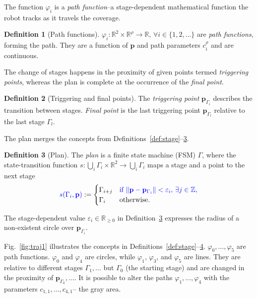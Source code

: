 \documentclass[letterpaper,10pt,journal,twoside]{IEEEtran}
\DeclarePairedDelimiter\norm{\lVert}{\rVert}%
\theoremstyle{definition}
\newtheorem{defn}{Definition}[section]
\begin{document}
The function $\varphi_i$ is a \emph{path function}{\color{blue}--a }%
stage-dependent mathematical function %
the %
robot tracks as it travels %
the coverage. 

\begin{defn}[Path functions]
  \label{def:paths}
  $\varphi_i:\mathbb{R}^2\times\mathbb{R}^\rho\rightarrow\mathbb{R},\,\forall i\in\{1,2,\dots\}
  $ are \emph{path functions}, forming the path. They are a function of {\color{blue}$\mathbf{p}%
  $} and path parameters $c_i^\rho%
  $ and are continuous.%
\end{defn}

The change of stages happens in the proximity of given points termed \emph{triggering points}, whereas the plan is complete at the occurrence of the \emph{final point}.

\begin{defn}[Triggering and final points]
  \label{def:trigs}
  The \emph{triggering point} $\mathbf{p}_{\Gamma_{i}}$ describes the transition between stages. \emph{Final point} is the last triggering point $\mathbf{p}_{\Gamma_{l}}$ relative to the last stage $\Gamma_l$.
\end{defn}

The plan merges the concepts from Definitions~\ref{def:stage}--\hyperref[def:trigs]{3}. %

\begin{defn}[Plan]\label{def:plan}
  The \emph{plan} is a finite state machine (FSM) $\Gamma$, where the state-transition function $s:\bigcup_i{\Gamma_i}\times\mathbb{R}^2\rightarrow\bigcup_i{\Gamma_i}$ maps a stage and a point to the next stage
  \begin{equation*}{\color{blue}s(\Gamma_i,\mathbf{p}%
    )}:=\begin{cases}
    \Gamma_{i+j} & {\color{blue}\text{if }\norm{\mathbf{p}%
    -\mathbf{p}_{\Gamma_i}}<\varepsilon_i,\,\exists j\in\mathbb{Z},}\\
    \Gamma_i & \text{otherwise}.
  \end{cases}\end{equation*}
\end{defn}

The stage-dependent value $\varepsilon_i\in\mathbb{R}_{\geq 0}$ in Definition~\ref{def:plan} expresses the radius of a non-existent circle over $\mathbf{p}_{\Gamma_i}$.

Fig.~\ref{fig:traj1} illustrates the concepts in Definitions~\ref{def:stage}--\hyperref[def:plan]{4}. $\varphi_0,\dots,\varphi_5$ are path functions. $\varphi_0$ and $\varphi_4$ are circles, while $\varphi_1$, $\varphi_3$, and $\varphi_5$ are lines. They are relative to different stages $\Gamma_1,\dots$ but $\Gamma_0$ (the starting stage) and are changed in the proximity of $\mathbf{p}_{\Gamma_0},\dots$. %
It is possible to alter the paths $\varphi_1,\dots,\varphi_4$ with the parameters $c_{1,1},\dots,c_{4,1}$--%
the gray area.%
\end{document}
